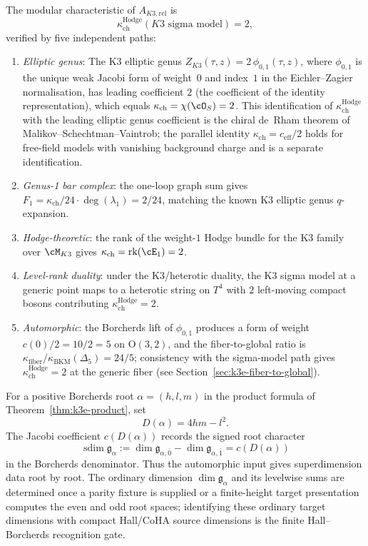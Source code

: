 \begin{theorem}
\label{thm:k3-kappa}
The modular characteristic of $A_{K3,\mathrm{rel}}$ is
\[
 \kappa_{\mathrm{ch}}^{\mathrm{Hodge}}(K3\text{ sigma model}) = 2,
\]
verified by five independent paths:
\begin{enumerate}[label=(\alph*)]
 \item \emph{Elliptic genus}: The K3 elliptic genus $Z_{K3}(\tau,z) = 2\,\phi_{0,1}(\tau,z)$, where $\phi_{0,1}$ is the unique weak Jacobi form of weight~$0$ and index~$1$ in the Eichler--Zagier normalisation, has leading coefficient $2$ (the coefficient of the identity representation), which equals $\kappa_{\mathrm{ch}} = \chi(\cO_S) = 2$. This identification of $\kappa_{\mathrm{ch}}^{\mathrm{Hodge}}$ with the leading elliptic genus coefficient is the chiral de~Rham theorem of Malikov--Schechtman--Vaintrob; the parallel identity $\kappa_{\mathrm{ch}} = c_{\mathrm{eff}}/2$ holds for free-field models with vanishing background charge and is a separate identification.
 \item \emph{Genus-1 bar complex}: the one-loop graph sum gives $F_1 = \kappa_{\mathrm{ch}}/24 \cdot \deg(\lambda_1) = 2/24$, matching the known K3 elliptic genus $q$-expansion.
 \item \emph{Hodge-theoretic}: the rank of the weight-$1$ Hodge bundle for the K3 family over $\cM_{K3}$ gives $\kappa_{\mathrm{ch}} = \mathrm{rk}(\cE_1) = 2$.
 \item \emph{Level-rank duality}: under the K3/heterotic duality, the K3 sigma model at a generic point maps to a heterotic string on $T^4$ with $2$ left-moving compact bosons contributing $\kappa_{\mathrm{ch}}^{\mathrm{Hodge}} = 2$.
 \item \emph{Automorphic}: the Borcherds lift of $\phi_{0,1}$ produces a form of weight $c(0)/2 = 10/2 = 5$ on $\mathrm{O}(3,2)$, and the fiber-to-global ratio is $\kappa_{\mathrm{fiber}}/\kappa_{\mathrm{BKM}}(\Delta_5) = 24/5$; consistency with the sigma-model path gives $\kappa_{\mathrm{ch}}^{\mathrm{Hodge}} = 2$ at the generic fiber (see Section~\ref{sec:k3e-fiber-to-global}).
\end{enumerate}
\end{theorem}

\begin{proposition}
\label{prop:k3e-total-mult}
For a positive Borcherds root $\alpha=(h,l,m)$ in the product formula
of Theorem~\ref{thm:k3e-product}, set
\[
 D(\alpha)=4hm-l^2.
\]
The Jacobi coefficient $c(D(\alpha))$ records the signed root character
\[
 \operatorname{sdim}\mathfrak g_\alpha
 :=
 \dim\mathfrak g_{\alpha,\bar0}
 -
 \dim\mathfrak g_{\alpha,\bar1}
 =
 c(D(\alpha))
\]
in the Borcherds denominator. Thus the automorphic input gives
superdimension data root by root. The ordinary dimension
$\dim\mathfrak g_\alpha$ and its levelwise sums are determined once a
parity fixture is supplied or a finite-height target presentation
computes the even and odd root spaces; identifying these ordinary
target dimensions with compact Hall/CoHA source dimensions is the
finite Hall--Borcherds recognition gate.
\end{proposition}

